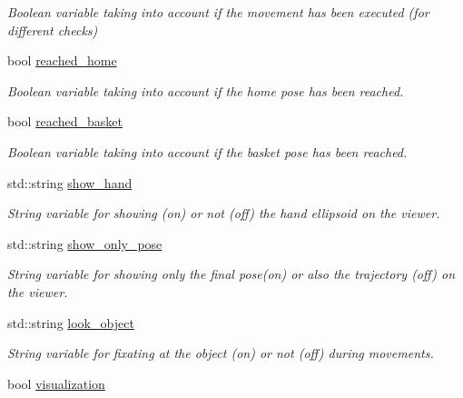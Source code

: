 \begin{DoxyCompactItemize}
\begin{DoxyCompactList}\small\item\em Boolean variable taking into account if the movement has been executed (for different checks) \end{DoxyCompactList}\item 
bool \hyperlink{classGraspingModule_af46e9f6a4a79bb39db0f975803d739b3}{reached\+\_\+home}\label{classGraspingModule_af46e9f6a4a79bb39db0f975803d739b3}

\begin{DoxyCompactList}\small\item\em Boolean variable taking into account if the home pose has been reached. \end{DoxyCompactList}\item 
bool \hyperlink{classGraspingModule_a295ffc6e5c40dea6d6e222f3f487ec67}{reached\+\_\+basket}\label{classGraspingModule_a295ffc6e5c40dea6d6e222f3f487ec67}

\begin{DoxyCompactList}\small\item\em Boolean variable taking into account if the basket pose has been reached. \end{DoxyCompactList}\item 
std\+::string \hyperlink{classGraspingModule_af05d3fc99e87d5ab513bb9fe91f0bcea}{show\+\_\+hand}\label{classGraspingModule_af05d3fc99e87d5ab513bb9fe91f0bcea}

\begin{DoxyCompactList}\small\item\em String variable for showing (on) or not (off) the hand ellipsoid on the viewer. \end{DoxyCompactList}\item 
std\+::string \hyperlink{classGraspingModule_ae9a9a1e59ba2298fac3c4f34996ec25e}{show\+\_\+only\+\_\+pose}\label{classGraspingModule_ae9a9a1e59ba2298fac3c4f34996ec25e}

\begin{DoxyCompactList}\small\item\em String variable for showing only the final pose(on) or also the trajectory (off) on the viewer. \end{DoxyCompactList}\item 
std\+::string \hyperlink{classGraspingModule_ac74a028982f21c24a3405deb41e70f9f}{look\+\_\+object}\label{classGraspingModule_ac74a028982f21c24a3405deb41e70f9f}

\begin{DoxyCompactList}\small\item\em String variable for fixating at the object (on) or not (off) during movements. \end{DoxyCompactList}\item 
bool \hyperlink{classGraspingModule_afb42ea3b2951d1e8abe7f391675d8f73}{visualization}\label{classGraspingModule_afb42ea3b2951d1e8abe7f391675d8f73}


\end{DoxyCompactItemize}
